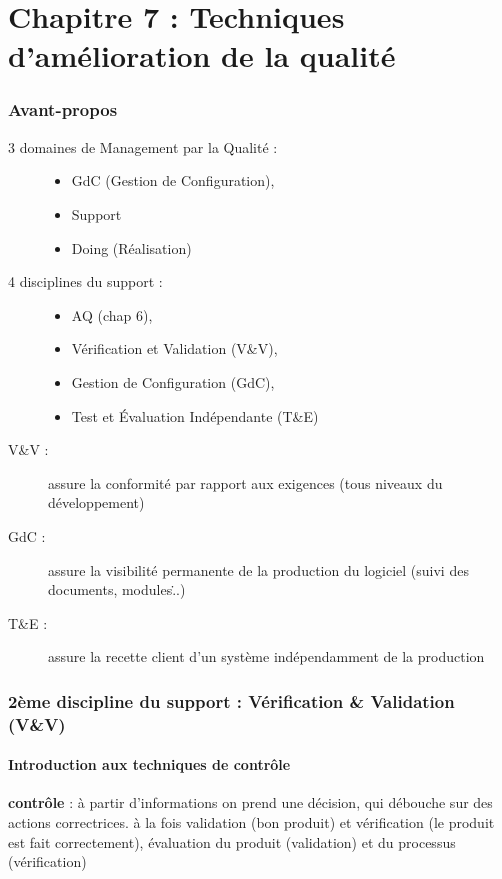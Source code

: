 \part{Chapitre 7 : Techniques d’amélioration de la qualité}

\section{Avant-propos}

\begin{description}
	\item[3 domaines de Management par la Qualité :]
	\begin{itemize}
		\item GdC (Gestion de Configuration),
		\item Support
		\item Doing (Réalisation)
	\end{itemize}

	\item[4 disciplines du support :]
	\begin{itemize}
		\item AQ (chap 6),
		\item Vérification et Validation (V\&V),
		\item Gestion de Configuration (GdC),
		\item Test et Évaluation Indépendante (T\&E)\\
	\end{itemize}
	\item[V\&V :] assure la conformité par rapport aux exigences (tous niveaux du développement)
	\item[GdC :] assure la visibilité permanente de la production du logiciel (suivi des documents, modules\...)
	\item[T\&E :] assure la recette client d’un système indépendamment de la production
\end{description}

\section{2ème discipline du support : Vérification \& Validation (V\&V)}

	\subsection{Introduction aux techniques de contrôle}

\textbf{contrôle} : à partir d’informations on prend une décision, qui débouche sur des actions correctrices. à la fois validation (bon produit) et vérification (le produit est fait correctement), évaluation du produit (validation) et du processus (vérification)\\\hfill\\


